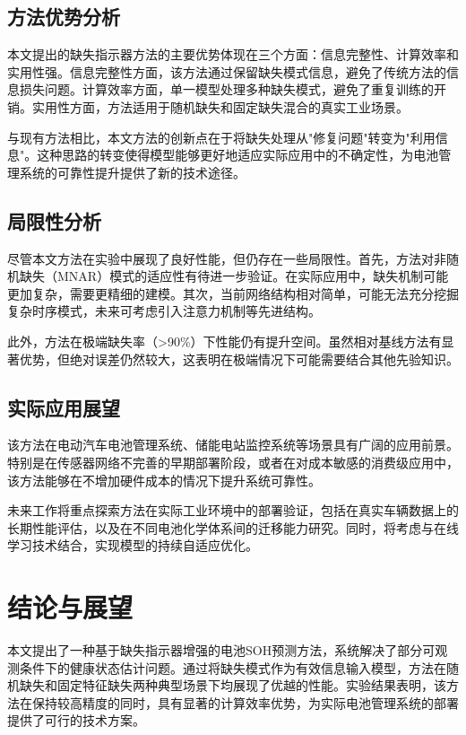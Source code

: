 \documentclass{ctexart}
\begin{document}
\subsection{方法优势分析}
本文提出的缺失指示器方法的主要优势体现在三个方面：信息完整性、计算效率和实用性强。信息完整性方面，该方法通过保留缺失模式信息，避免了传统方法的信息损失问题。计算效率方面，单一模型处理多种缺失模式，避免了重复训练的开销。实用性方面，方法适用于随机缺失和固定缺失混合的真实工业场景。

与现有方法相比，本文方法的创新点在于将缺失处理从"修复问题"转变为"利用信息"。这种思路的转变使得模型能够更好地适应实际应用中的不确定性，为电池管理系统的可靠性提升提供了新的技术途径。

\subsection{局限性分析}
尽管本文方法在实验中展现了良好性能，但仍存在一些局限性。首先，方法对非随机缺失（MNAR）模式的适应性有待进一步验证。在实际应用中，缺失机制可能更加复杂，需要更精细的建模。其次，当前网络结构相对简单，可能无法充分挖掘复杂时序模式，未来可考虑引入注意力机制等先进结构。

此外，方法在极端缺失率（>90\%）下性能仍有提升空间。虽然相对基线方法有显著优势，但绝对误差仍然较大，这表明在极端情况下可能需要结合其他先验知识。

\subsection{实际应用展望}
该方法在电动汽车电池管理系统、储能电站监控系统等场景具有广阔的应用前景。特别是在传感器网络不完善的早期部署阶段，或者在对成本敏感的消费级应用中，该方法能够在不增加硬件成本的情况下提升系统可靠性。

未来工作将重点探索方法在实际工业环境中的部署验证，包括在真实车辆数据上的长期性能评估，以及在不同电池化学体系间的迁移能力研究。同时，将考虑与在线学习技术结合，实现模型的持续自适应优化。

\section{结论与展望}

本文提出了一种基于缺失指示器增强的电池SOH预测方法，系统解决了部分可观测条件下的健康状态估计问题。通过将缺失模式作为有效信息输入模型，方法在随机缺失和固定特征缺失两种典型场景下均展现了优越的性能。实验结果表明，该方法在保持较高精度的同时，具有显著的计算效率优势，为实际电池管理系统的部署提供了可行的技术方案。
\end{document}
